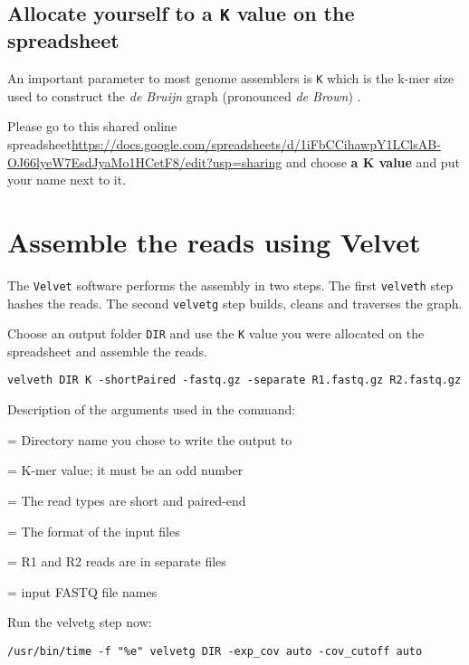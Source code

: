 \subsection{Allocate yourself to a \texttt{K} value on the spreadsheet}

An important parameter to most genome assemblers is \texttt{K} which is the
k-mer size used to construct the \textit{de Bruijn} graph (pronounced \textit{de Brown}) .

Please go to this shared online spreadsheet\url{https://docs.google.com/spreadsheets/d/1iFbCCihawpY1LClsAB-OJ66lyeW7EsdJyaMo1HCetF8/edit?usp=sharing}
and choose \textbf{a K value} and put your name next to it.

\section{Assemble the reads using Velvet}
The \texttt{Velvet} software performs the assembly in two steps. The first \texttt{velveth}
step hashes the reads. The second \texttt{velvetg} step builds, cleans and traverses the graph.

\begin{steps}
Choose an output folder \texttt{DIR} and use the \texttt{K} value you were allocated on the spreadsheet and assemble the reads.
\begin{lstlisting}
velveth DIR K -shortPaired -fastq.gz -separate R1.fastq.gz R2.fastq.gz
\end{lstlisting}
\end{steps}

Description of the arguments used in the command:
\begin{description}[style=multiline,labelindent=0cm,align=right,leftmargin=\descriptionlabelspace,rightmargin=1.5cm,font=\ttfamily]
  \item[DIR] = Directory name you chose to write the output to
  \item[K] = K-mer value; it must be an odd number
  \item[-shortPaired] = The read types are short and paired-end
  \item[-fastq.gz] = The format of the input files
  \item[-separate] = R1 and R2 reads are in separate files
  \item[input file names] = input FASTQ file names
\end{description}

\begin{steps}
Run the velvetg step now:
\begin{lstlisting}
/usr/bin/time -f "%e" velvetg DIR -exp_cov auto -cov_cutoff auto
\end{lstlisting}
\end{steps}

